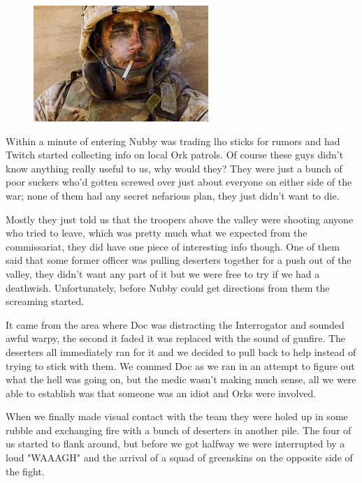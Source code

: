 \begin{figure}
	\begin{center}
		\includegraphics[width=\figwidth]{pics/9/19.png}
	\end{center}
\end{figure}
Within a minute of entering Nubby was trading lho sticks for rumors and had Twitch started collecting info on local Ork patrols. 
Of course these guys didn't know anything really useful to us, why would they? 
They were just a bunch of poor suckers who'd gotten screwed over just about everyone on either side of the war; 
none of them had any secret nefarious plan, they just didn't want to die. 


Mostly they just told us that the troopers above the valley were shooting anyone who tried to leave, which was pretty much what we expected from the commissariat, they did have one piece of interesting info though. 
One of them said that some former officer was pulling deserters together for a push out of the valley, they didn't want any part of it but we were free to try if we had a deathwish. 
Unfortunately, before Nubby could get directions from them the screaming started.

It came from the area where Doc was distracting the Interrogator and sounded awful warpy, the second it faded it was replaced with the sound of gunfire. 
The deserters all immediately ran for it and we decided to pull back to help instead of trying to stick with them. 
We commed Doc as we ran in an attempt to figure out what the hell was going on, but the medic wasn't making much sense, all we were able to establish was that someone was an idiot and Orks were involved. 


When we finally made visual contact with the team they were holed up in some rubble and exchanging fire with a bunch of deserters in another pile. 
The four of us started to flank around, but before we got halfway we were interrupted by a loud "WAAAGH" and the arrival of a squad of greenskins on the opposite side of the fight.

